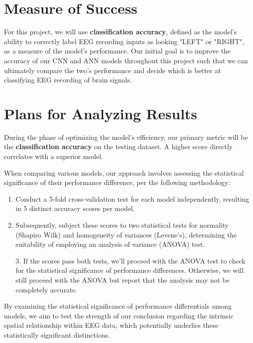 \documentclass[11pt]{article}
\begin{document}
    
    

\section{Measure of Success}


For this project, we will use \textbf{classification accuracy}, defined as the model's ability to correctly label EEG recording inputs as looking "LEFT" or "RIGHT", as a measure of the model's performance. Our initial goal is to improve the accuracy of our CNN and ANN models throughout this project such that we can ultimately compare the two's performance and decide which is better at classifying EEG recording of brain signals.

\section{Plans for Analyzing Results}

During the phase of optimizing the model's efficiency, our primary metric will be the \textbf{classification accuracy} on the testing dataset. A higher score directly correlates with a superior model.

When comparing various models, our approach involves assessing the statistical significance of their performance difference, per the following methodology:

\begin{enumerate}
    \item Conduct a 5-fold cross-validation test for each model independently, resulting in 5 distinct accuracy scores per model.

    \item Subsequently, subject these scores to two statistical tests for normality (Shapiro Wilk) and homogeneity of variances (Levene's), determining the suitability of employing an analysis of variance (ANOVA) test.

    3. If the scores pass both tests, we'll proceed with the ANOVA test to check for the statistical significance of performance differences. Otherwise, we will still proceed with the ANOVA but report that the analysis may not be completely accurate.
\end{enumerate}

By examining the statistical significance of performance differentials among models, we aim to test the strength of our conclusion regarding the intrinsic spatial relationship within EEG data, which potentially underlies these statistically significant distinctions.
\end{document}
